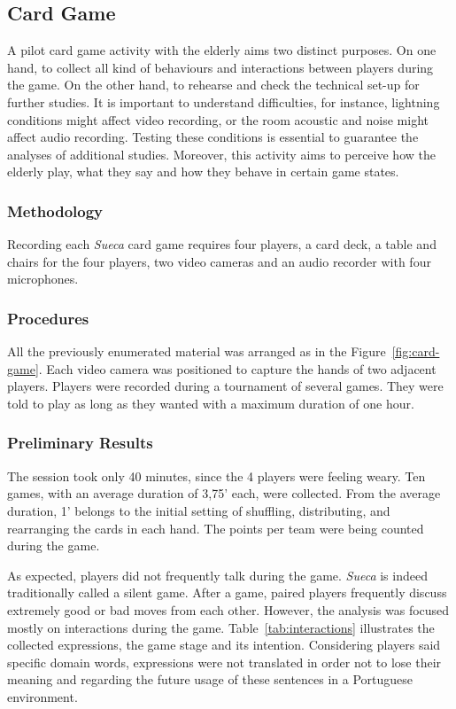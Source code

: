 \subsection{Card Game}

A pilot card game activity with the elderly aims two distinct purposes.
On one hand, to collect all kind of behaviours and interactions between players during the game.
On the other hand, to rehearse and check the technical set-up for further studies.
It is important to understand difficulties, for instance, lightning conditions might affect video recording, or the room acoustic and noise might affect audio recording.
Testing these conditions is essential to guarantee the analyses of additional studies.
Moreover, this activity aims to perceive how the elderly play, what they say and how they behave in certain game states.

\subsubsection{Methodology}
Recording each \emph{Sueca} card game requires four players, a card deck, a table and chairs for the four players, two video cameras and an audio recorder with four microphones.

\subsubsection{Procedures}
All the previously enumerated material was arranged as in the Figure~\ref{fig:card-game}.
Each video camera was positioned to capture the hands of two adjacent players.
Players were recorded during a tournament of several games.
They were told to play as long as they wanted with a maximum duration of one hour.

\subsubsection{Preliminary Results}
The session took only 40 minutes, since the 4 players were feeling weary.
Ten games, with an average duration of 3,75' each, were collected.
From the average duration, 1' belongs to the initial setting of shuffling, distributing, and rearranging the cards in each hand.
The points per team were being counted during the game.

As expected, players did not frequently talk during the game.
\emph{Sueca} is indeed traditionally called a silent game.
After a game, paired players frequently discuss extremely good or bad moves from each other.
However, the analysis was focused mostly on interactions during the game.
Table~\ref{tab:interactions} illustrates the collected expressions, the game stage and its intention.
Considering players said specific domain words, expressions were not translated in order not to lose their meaning and regarding the future usage of these sentences in a Portuguese environment.



